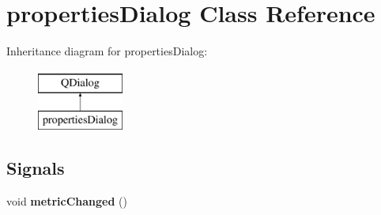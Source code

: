 \hypertarget{classproperties_dialog}{}\section{properties\+Dialog Class Reference}
\label{classproperties_dialog}
Inheritance diagram for properties\+Dialog\+:\begin{figure}[H]
\begin{center}
\leavevmode
\includegraphics[height=2.000000cm]{classproperties_dialog}
\end{center}
\end{figure}
\subsection*{Signals}
\begin{DoxyCompactItemize}
\item 
\mbox{\label{classproperties_dialog_a68bf43407ab7513191021bed8f974846}} 
void {\bfseries metric\+Changed} ()
\end{DoxyCompactItemize}
